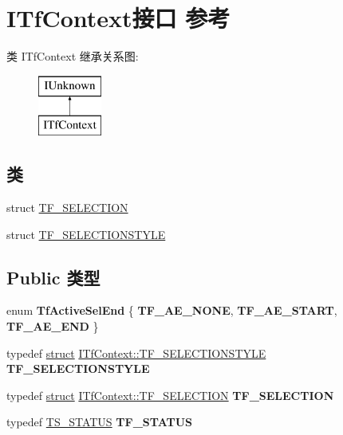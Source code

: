\hypertarget{interface_i_tf_context}{}\section{I\+Tf\+Context接口 参考}
\label{interface_i_tf_context}
类 I\+Tf\+Context 继承关系图\+:\begin{figure}[H]
\begin{center}
\leavevmode
\includegraphics[height=2.000000cm]{interface_i_tf_context}
\end{center}
\end{figure}
\subsection*{类}
\begin{DoxyCompactItemize}
\item 
struct \hyperlink{struct_i_tf_context_1_1_t_f___s_e_l_e_c_t_i_o_n}{T\+F\+\_\+\+S\+E\+L\+E\+C\+T\+I\+ON}
\item 
struct \hyperlink{struct_i_tf_context_1_1_t_f___s_e_l_e_c_t_i_o_n_s_t_y_l_e}{T\+F\+\_\+\+S\+E\+L\+E\+C\+T\+I\+O\+N\+S\+T\+Y\+LE}
\end{DoxyCompactItemize}
\subsection*{Public 类型}
\begin{DoxyCompactItemize}
\item 
\mbox{\label{interface_i_tf_context_ac34987581c6929b11d837385617e318a}} 
enum {\bfseries Tf\+Active\+Sel\+End} \{ {\bfseries T\+F\+\_\+\+A\+E\+\_\+\+N\+O\+NE}, 
{\bfseries T\+F\+\_\+\+A\+E\+\_\+\+S\+T\+A\+RT}, 
{\bfseries T\+F\+\_\+\+A\+E\+\_\+\+E\+ND}
 \}
\item 
\mbox{\label{interface_i_tf_context_ada9c1201a2353de3afc32559b1d5d7ef}} 
typedef \hyperlink{interfacestruct}{struct} \hyperlink{struct_i_tf_context_1_1_t_f___s_e_l_e_c_t_i_o_n_s_t_y_l_e}{I\+Tf\+Context\+::\+T\+F\+\_\+\+S\+E\+L\+E\+C\+T\+I\+O\+N\+S\+T\+Y\+LE} {\bfseries T\+F\+\_\+\+S\+E\+L\+E\+C\+T\+I\+O\+N\+S\+T\+Y\+LE}
\item 
\mbox{\label{interface_i_tf_context_a3c613f8d54f3954efd30ef78be1ce96f}} 
typedef \hyperlink{interfacestruct}{struct} \hyperlink{struct_i_tf_context_1_1_t_f___s_e_l_e_c_t_i_o_n}{I\+Tf\+Context\+::\+T\+F\+\_\+\+S\+E\+L\+E\+C\+T\+I\+ON} {\bfseries T\+F\+\_\+\+S\+E\+L\+E\+C\+T\+I\+ON}
\item 
\mbox{\label{interface_i_tf_context_ae57e25bae3ce27b8696d0dea86641303}} 
typedef \hyperlink{struct_t_s___s_t_a_t_u_s}{T\+S\+\_\+\+S\+T\+A\+T\+US} {\bfseries T\+F\+\_\+\+S\+T\+A\+T\+US}
\end{DoxyCompactItemize}
